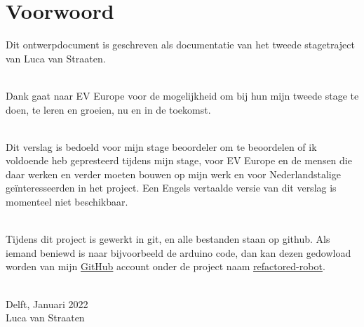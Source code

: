 \chapter*{Voorwoord}

Dit ontwerpdocument is geschreven als documentatie van het tweede stagetraject
van Luca van Straaten.\\\

Dank gaat naar EV Europe voor de mogelijkheid om bij hun mijn tweede stage te
doen, te leren en groeien, nu en in de toekomst.\\\

Dit verslag is bedoeld voor mijn stage beoordeler om te beoordelen of ik
voldoende heb gepresteerd tijdens mijn stage, voor EV Europe en de mensen die
daar werken en verder moeten bouwen op mijn werk en voor Nederlandstalige
geïnteresseerden in het project. Een Engels vertaalde versie van dit verslag
is momenteel niet beschikbaar.\\\

Tijdens dit project is gewerkt in git, en alle bestanden staan op github. Als
iemand beniewd is naar bijvoorbeeld de arduino code, dan kan dezen gedowload
worden van mijn \href{https://github.com/lucanatorvs}{GitHub} account onder de
project naam \href{https://github.com/lucanatorvs/refactored-robot}{refactored-robot}.\\\

Delft, Januari 2022\\Luca van Straaten
